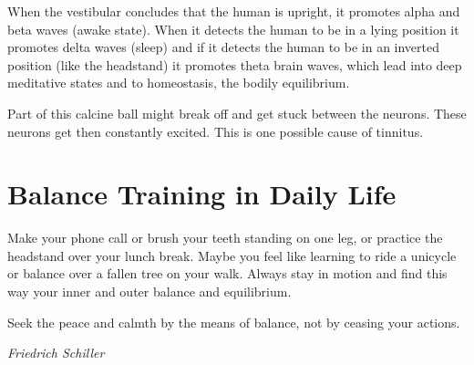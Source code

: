 \documentclass[../main.tex]{subfiles}
\begin{document}
        When the vestibular concludes that the human is upright, it promotes alpha
        and beta waves (awake state). When it detects the human to be in a lying position it promotes delta waves (sleep) and if it detects the human to be in an inverted position (like the headstand) it promotes theta brain waves, which lead into deep meditative states and to homeostasis, the bodily equilibrium.

        Part of this calcine ball might break off and get stuck between the neurons.
        These neurons get then constantly excited. This is one possible cause of tinnitus.

        \section{Balance Training in Daily Life}

        Make your phone call or brush your teeth standing on one leg, or practice the headstand over your lunch break.
        Maybe you feel like learning to ride a unicycle or balance over a fallen tree on your walk.
        Always stay in motion and find this way your inner and outer balance and equilibrium.

        \epigraph{Seek the peace and calmth by the means of balance, not by ceasing your actions.}{\textit{Friedrich Schiller}}
        
      
\end{document}
